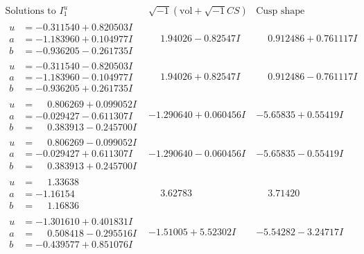 \documentclass[1p]{elsarticle_modified}
\theoremstyle{definition}
\newcommand{\I}{\sqrt{-1}}
\begin{document}
$$\begin{array}{c|c|c}  
\text{Solutions to }I^u_{1}& \I (\text{vol} + \sqrt{-1}CS) & \text{Cusp shape}\\
 \hline 
\begin{aligned}
u &= -0.311540 + 0.820503 I \\
a &= -1.183960 + 0.104977 I \\
b &= -0.936205 - 0.261735 I\end{aligned}
 & \phantom{-}1.94026 - 0.82547 I & \phantom{-}0.912486 + 0.761117 I \\ \hline\begin{aligned}
u &= -0.311540 - 0.820503 I \\
a &= -1.183960 - 0.104977 I \\
b &= -0.936205 + 0.261735 I\end{aligned}
 & \phantom{-}1.94026 + 0.82547 I & \phantom{-}0.912486 - 0.761117 I \\ \hline\begin{aligned}
u &= \phantom{-}0.806269 + 0.099052 I \\
a &= -0.029427 - 0.611307 I \\
b &= \phantom{-}0.383913 - 0.245700 I\end{aligned}
 & -1.290640 + 0.060456 I & -5.65835 + 0.55419 I \\ \hline\begin{aligned}
u &= \phantom{-}0.806269 - 0.099052 I \\
a &= -0.029427 + 0.611307 I \\
b &= \phantom{-}0.383913 + 0.245700 I\end{aligned}
 & -1.290640 - 0.060456 I & -5.65835 - 0.55419 I \\ \hline\begin{aligned}
u &= \phantom{-}1.33638\phantom{ +0.000000I} \\
a &= -1.16154\phantom{ +0.000000I} \\
b &= \phantom{-}1.16836\phantom{ +0.000000I}\end{aligned}
 & \phantom{-}3.62783\phantom{ +0.000000I} & \phantom{-}3.71420\phantom{ +0.000000I} \\ \hline\begin{aligned}
u &= -1.301610 + 0.401831 I \\
a &= \phantom{-}0.508418 - 0.295516 I \\
b &= -0.439577 + 0.851076 I\end{aligned}
 & -1.51005 + 5.52302 I & -5.54282 - 3.24717 I \\ \hline\begin{aligned}

\end{aligned}
\end{array}$$
\end{document}

